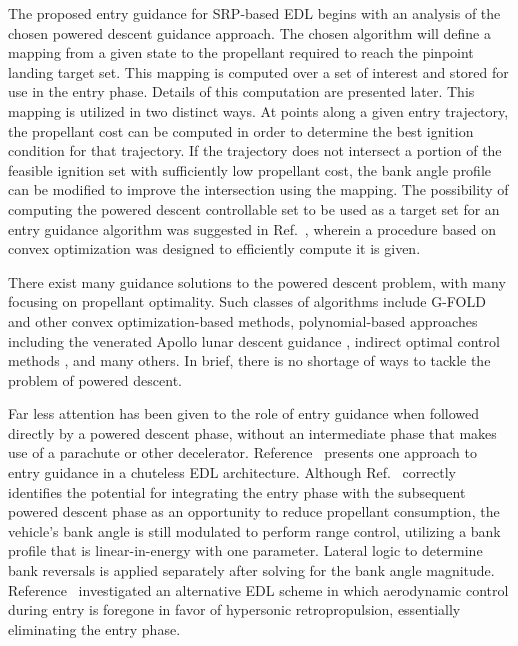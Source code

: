 \documentclass[letterpaper, preprint, paper,11pt]{AAS}
\begin{document}

The proposed entry guidance for SRP-based EDL begins with an analysis of the chosen powered descent guidance approach. The chosen algorithm will define a mapping from a given state to the propellant required to reach the pinpoint landing target set. This mapping is computed over a set of interest and stored for use in the entry phase. Details of this computation are presented later. This mapping is utilized in two distinct ways. At points along a given entry trajectory, the propellant cost can be computed in order to determine the best ignition condition for that trajectory. If the trajectory does not intersect a portion of the feasible ignition set with sufficiently low propellant cost, the bank angle profile can be modified to improve the intersection using the mapping.  
The possibility of computing the powered descent controllable set to be used as a target set for an entry guidance algorithm was suggested in Ref.~\cite{SRP_ControllableSets}, wherein a procedure based on convex optimization was designed to efficiently compute it is given. 

There exist many guidance solutions to the powered descent problem, with many focusing on propellant optimality. Such classes of algorithms include G-FOLD\cite{gfold,gfold_flighttests} and other convex optimization-based methods, polynomial-based approaches including the venerated Apollo lunar descent guidance \cite{apollo_lunar}, indirect optimal control methods \cite{PropellantOptimalAdaptiveTrigger}, and many others. In brief, there is no shortage of ways to tackle the problem of powered descent.


Far less attention has been given to the role of entry guidance when followed directly by a powered descent phase, without an intermediate phase that makes use of a parachute or other decelerator. Reference~\cite{LuAdaptiveEDL} presents one approach to entry guidance in a chuteless EDL architecture. Although Ref.~\cite{LuAdaptiveEDL} correctly identifies the potential for integrating the entry phase with the subsequent powered descent phase as an opportunity to reduce propellant consumption, the vehicle's bank angle is still modulated to perform range control, utilizing a bank profile that is linear-in-energy with one parameter. Lateral logic to determine bank reversals is applied separately after solving for the bank angle magnitude. Reference~\cite{EDL_AllProp} investigated an alternative EDL scheme in which aerodynamic control during entry is foregone in favor of hypersonic retropropulsion, essentially eliminating the entry phase. 
\end{document}
